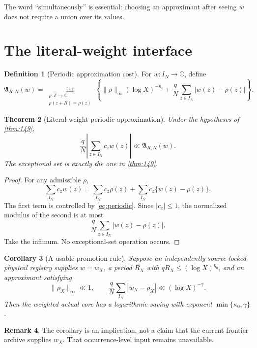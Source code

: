\documentclass[11pt]{article}
\newtheorem{theorem}{Theorem}[section]
\newtheorem{corollary}[theorem]{Corollary}
\theoremstyle{definition}
\newtheorem{definition}[theorem]{Definition}
\newtheorem{remark}[theorem]{Remark}
\newcommand{\A}{\mathfrak A}
\newcommand{\norm}[1]{\lVert#1\rVert}
\begin{document}
The word ``simultaneously'' is essential: choosing an approximant
after seeing \(w\) does not require a union over its values.

\section{The literal-weight interface}

\begin{definition}[Periodic approximation cost]\label{def:cost}
For \(w:I_N\to\mathbb C\), define
\begin{equation}
 \A_{R,N}(w)=
 \inf_{\substack{\rho:\mathbb Z\to\mathbb C\\\rho(z+R)=\rho(z)}}
 \left\{
 \norm{\rho}_\infty(\log X)^{-\kappa_0}
 +\frac qN\sum_{z\in I_N}|w(z)-\rho(z)|
 \right\}.
\label{eq:cost}
\end{equation}
\end{definition}

\begin{theorem}[Literal-weight periodic approximation]\label{thm:main}
Under the hypotheses of \cref{thm:149},
\begin{equation}
 \boxed{\;
 \frac qN\left|\sum_{z\in I_N}c_zw(z)\right|
 \ll \A_{R,N}(w).\;}
\label{eq:main}
\end{equation}
The exceptional set is exactly the one in \cref{thm:149}.
\end{theorem}

\begin{proof}
For any admissible \(\rho\),
\[
 \sum_{I_N}c_zw(z)
 =
 \sum_{I_N}c_z\rho(z)
 +\sum_{I_N}c_z\{w(z)-\rho(z)\}.
\]
The first term is controlled by \eqref{eq:periodic}.  Since
\(|c_z|\le1\), the normalized modulus of the second is at most
\[
 \frac qN\sum_{z\in I_N}|w(z)-\rho(z)|.
\]
Take the infimum.  No exceptional-set operation occurs.
\end{proof}

\begin{corollary}[A usable promotion rule]\label{cor:promotion}
Suppose an independently source-locked physical registry supplies
\(w=w_X\), a period \(R_X\) with
\(qR_X\le(\log X)^{\eta_0}\), and an approximant satisfying
\[
 \norm{\rho_X}_\infty\ll1,\qquad
 \frac qN\sum_{I_N}|w_X-\rho_X|
 \ll(\log X)^{-\gamma}.
\]
Then the weighted actual core has a logarithmic saving with exponent
\(\min\{\kappa_0,\gamma\}\).
\end{corollary}

\begin{remark}
The corollary is an implication, not a claim that the current
frontier archive supplies \(w_X\).  That occurrence-level input
remains unavailable.
\end{remark}
\end{document}
